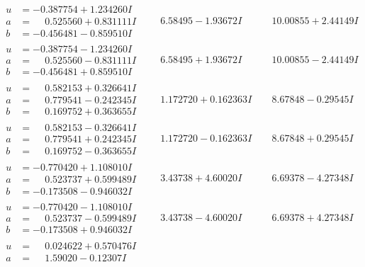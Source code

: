 \documentclass[1p]{elsarticle_modified}
\theoremstyle{definition}
\begin{document}
$$\begin{array}{c|c|c}
\begin{aligned}
u &= -0.387754 + 1.234260 I \\
a &= \phantom{-}0.525560 + 0.831111 I \\
b &= -0.456481 - 0.859510 I\end{aligned}
 & \phantom{-}6.58495 - 1.93672 I & \phantom{-}10.00855 + 2.44149 I \\ \hline\begin{aligned}
u &= -0.387754 - 1.234260 I \\
a &= \phantom{-}0.525560 - 0.831111 I \\
b &= -0.456481 + 0.859510 I\end{aligned}
 & \phantom{-}6.58495 + 1.93672 I & \phantom{-}10.00855 - 2.44149 I \\ \hline\begin{aligned}
u &= \phantom{-}0.582153 + 0.326641 I \\
a &= \phantom{-}0.779541 - 0.242345 I \\
b &= \phantom{-}0.169752 + 0.363655 I\end{aligned}
 & \phantom{-}1.172720 + 0.162363 I & \phantom{-}8.67848 - 0.29545 I \\ \hline\begin{aligned}
u &= \phantom{-}0.582153 - 0.326641 I \\
a &= \phantom{-}0.779541 + 0.242345 I \\
b &= \phantom{-}0.169752 - 0.363655 I\end{aligned}
 & \phantom{-}1.172720 - 0.162363 I & \phantom{-}8.67848 + 0.29545 I \\ \hline\begin{aligned}
u &= -0.770420 + 1.108010 I \\
a &= \phantom{-}0.523737 + 0.599489 I \\
b &= -0.173508 - 0.946032 I\end{aligned}
 & \phantom{-}3.43738 + 4.60020 I & \phantom{-}6.69378 - 4.27348 I \\ \hline\begin{aligned}
u &= -0.770420 - 1.108010 I \\
a &= \phantom{-}0.523737 - 0.599489 I \\
b &= -0.173508 + 0.946032 I\end{aligned}
 & \phantom{-}3.43738 - 4.60020 I & \phantom{-}6.69378 + 4.27348 I \\ \hline\begin{aligned}
u &= \phantom{-}0.024622 + 0.570476 I \\
a &= \phantom{-}1.59020 - 0.12307 I \\

\end{aligned}
\end{array}$$
\end{document}

